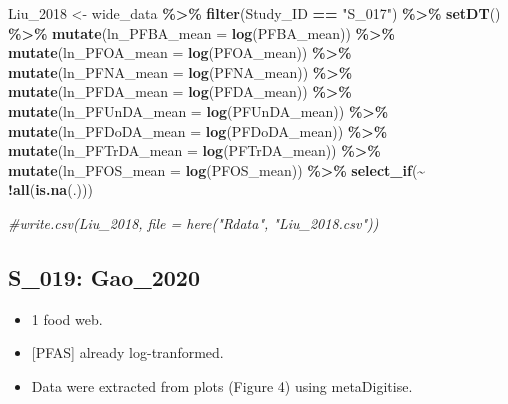 \documentclass[
]{article}
\newenvironment{Shaded}{\begin{snugshade}}{\end{snugshade}}
\newcommand{\AttributeTok}[1]{\textcolor[rgb]{0.13,0.29,0.53}{#1}}
\newcommand{\CommentTok}[1]{\textcolor[rgb]{0.56,0.35,0.01}{\textit{#1}}}
\newcommand{\FunctionTok}[1]{\textcolor[rgb]{0.13,0.29,0.53}{\textbf{#1}}}
\newcommand{\NormalTok}[1]{#1}
\newcommand{\OtherTok}[1]{\textcolor[rgb]{0.56,0.35,0.01}{#1}}
\newcommand{\SpecialCharTok}[1]{\textcolor[rgb]{0.81,0.36,0.00}{\textbf{#1}}}
\newcommand{\StringTok}[1]{\textcolor[rgb]{0.31,0.60,0.02}{#1}}
\providecommand{\tightlist}{%
  \setlength{\itemsep}{0pt}\setlength{\parskip}{0pt}}
\begin{document}
\begin{Shaded}
\begin{Highlighting}[]
\NormalTok{Liu\_2018 }\OtherTok{\textless{}{-}}\NormalTok{ wide\_data }\SpecialCharTok{\%\textgreater{}\%} 
  \FunctionTok{filter}\NormalTok{(Study\_ID }\SpecialCharTok{==} \StringTok{"S\_017"}\NormalTok{) }\SpecialCharTok{\%\textgreater{}\%}
  \FunctionTok{setDT}\NormalTok{() }\SpecialCharTok{\%\textgreater{}\%} 
  \FunctionTok{mutate}\NormalTok{(}\AttributeTok{ln\_PFBA\_mean =} \FunctionTok{log}\NormalTok{(PFBA\_mean)) }\SpecialCharTok{\%\textgreater{}\%}
  \FunctionTok{mutate}\NormalTok{(}\AttributeTok{ln\_PFOA\_mean =} \FunctionTok{log}\NormalTok{(PFOA\_mean)) }\SpecialCharTok{\%\textgreater{}\%}
  \FunctionTok{mutate}\NormalTok{(}\AttributeTok{ln\_PFNA\_mean =} \FunctionTok{log}\NormalTok{(PFNA\_mean)) }\SpecialCharTok{\%\textgreater{}\%}
  \FunctionTok{mutate}\NormalTok{(}\AttributeTok{ln\_PFDA\_mean =} \FunctionTok{log}\NormalTok{(PFDA\_mean)) }\SpecialCharTok{\%\textgreater{}\%}
  \FunctionTok{mutate}\NormalTok{(}\AttributeTok{ln\_PFUnDA\_mean =} \FunctionTok{log}\NormalTok{(PFUnDA\_mean)) }\SpecialCharTok{\%\textgreater{}\%}
  \FunctionTok{mutate}\NormalTok{(}\AttributeTok{ln\_PFDoDA\_mean =} \FunctionTok{log}\NormalTok{(PFDoDA\_mean)) }\SpecialCharTok{\%\textgreater{}\%}
  \FunctionTok{mutate}\NormalTok{(}\AttributeTok{ln\_PFTrDA\_mean =} \FunctionTok{log}\NormalTok{(PFTrDA\_mean)) }\SpecialCharTok{\%\textgreater{}\%}
  \FunctionTok{mutate}\NormalTok{(}\AttributeTok{ln\_PFOS\_mean =} \FunctionTok{log}\NormalTok{(PFOS\_mean)) }\SpecialCharTok{\%\textgreater{}\%}
  \FunctionTok{select\_if}\NormalTok{(}\SpecialCharTok{\textasciitilde{}} \SpecialCharTok{!}\FunctionTok{all}\NormalTok{(}\FunctionTok{is.na}\NormalTok{(.)))}

\CommentTok{\#write.csv(Liu\_2018, file = here("Rdata", "Liu\_2018.csv"))}
\end{Highlighting}
\end{Shaded}

\subsection{S\_019: Gao\_2020}\label{s_019-gao_2020}

\begin{itemize}
\tightlist
\item
  1 food web.
\item
  {[}PFAS{]} already log-tranformed.
\item
  Data were extracted from plots (Figure 4) using metaDigitise.
\end{itemize}
\end{document}
